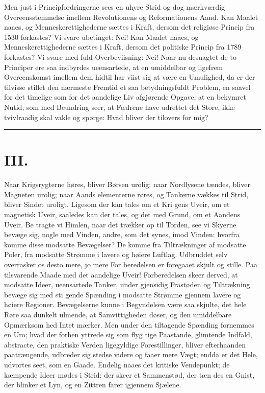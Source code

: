 \documentclass[12pt]{book}
\newcommand{\opage}[1]{\marginnote{\footnotesize\textit{[#1]}}}
\begin{document}
Men just i Principfordringerne sees en uhyre Strid
og dog mærkværdig Overeensstemmelse imellem Revolutionens
og Reformationens Aand. Kan Maalet naaes,
og Menneskerettighederne sættes i Kraft, dersom det
religiøse Princip fra 1530 forkastes? Vi svare ubetinget:
Nei! Kan Maalet naaes, og Menneskerettighederne sættes
i Kraft, dersom det politiske Princip fra 1789 forkastes?
Vi svare med fuld Overbeviisning: Nei! Naar nu desuagtet
de to Principer ere saa indbyrdes ueensartede, at
en umiddelbar og ligefrem Overeenskomst imellem dem
hidtil har viist sig at være en Umulighed, da er der tilvisse
stillet den nærmeste Fremtid et saa betydningsfuldt Problem,
en saavel for det timelige som for det aandelige Liv afgjørende
Opgave, at en bekymret Nutid, som med Beundring
seer, at Fædrene have udrettet det Store, ikke
tvivlraadig skal vakle og spørge: Hvad bliver der tilovers
for mig?

\begin{center}\rule{3cm}{0.4pt}\end{center}

\chapter*{III.}
\label{ch:iii}
\opage{36}\setcounter{footnote}{0}%
Naar Krigsrygterne høres, bliver Børsen urolig; naar
Nordlysene tændes, bliver Magneten urolig; naar Aands\-%
elementerne røres, og Tankerne vækkes til Strid, bliver
Sindet uroligt. Ligesom der kan tales om et Kri\-%
gens Uveir, om et magnetisk Uveir, saaledes kan der
tales, og det med Grund, om et Aandens Uveir. Be\-%
tragte vi Himlen, naar det trækker op til Torden, see
vi Skyerne bevæge sig, nogle med Vinden, andre, som
det synes, imod Vinden: hvorfra komme disse modsatte
Bevægelser? De komme fra Tiltrækninger af modsatte
Poler, fra modsatte Strømme i lavere og høiere Luftlag.
Udbruddet selv overrasker os desto mere, jo mere For\-%
beredelsen er foregaaet skjult og stille. Paa tilsvarende
Maade med det aandelige Uveir! Forberedelsen skeer
derved, at modsatte Ideer, ueensartede Tanker, under
gjensidig Frastøden og Tiltrækning bevæge sig med sti\-%
gende Spænding i modsatte Strømme gjennem lavere
og høiere Regioner. Bevægelserne kunne i Begyndelsen
være saa skjulte, det hele Røre saa dunkelt ulmende, at
Samvittigheden døser, og den umiddelbare Opmærksom\-%
hed Intet mærker. Men under den tiltagende Spænding
fornemmes en Uro; hvad der forhen yttrede sig som flyg\-%
tige Paastande, glimtende Indfald, abstracte, den praktiske
\opage{37}\setcounter{footnote}{0}%
Verden ligegyldige Forestillinger, bliver efterhaanden
paatrængende, udbreder sig stedse videre og faaer mere
Vægt; endda er det Hele, udvortes seet, som en Gaade.
Endelig naaes det kritiske Vendepunkt; de kæmpende
Ideer mødes i Strid: der skeer et Sammenstød, der tæn\-%
des en Gnist, der blinker et Lyn, og en Zittren farer
igjennem Sjælene.
\end{document}
